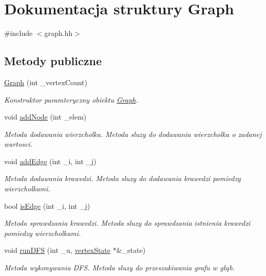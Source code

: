 \hypertarget{struct_graph}{\section{Dokumentacja struktury Graph}
\label{struct_graph}
}


{\ttfamily \#include $<$graph.\-hh$>$}

\subsection*{Metody publiczne}
\begin{DoxyCompactItemize}
\item 
\hyperlink{struct_graph_af3ba578bbc7a49562ff5de0f5f37c663}{Graph} (int \-\_\-vertex\-Count)
\begin{DoxyCompactList}\small\item\em Konstruktor paramteryczny obiektu \hyperlink{struct_graph}{Graph}. \end{DoxyCompactList}\item 
void \hyperlink{struct_graph_a8ad83b85369c9d92229137873f9089b8}{add\-Node} (int \-\_\-elem)
\begin{DoxyCompactList}\small\item\em Metoda dodawania wierzcholka. Metoda sluzy do dodawania wierzcholka o zadanej wartosci. \end{DoxyCompactList}\item 
void \hyperlink{struct_graph_a97e1714cf7b5f082158d112a0fbd4141}{add\-Edge} (int \-\_\-i, int \-\_\-j)
\begin{DoxyCompactList}\small\item\em Metoda dodawania krawedzi. Metoda sluzy do dodawania krawedzi pomiedzy wierzcholkami. \end{DoxyCompactList}\item 
bool \hyperlink{struct_graph_af8505da7d2360f8bf6daba137ed6ab9e}{is\-Edge} (int \-\_\-i, int \-\_\-j)
\begin{DoxyCompactList}\small\item\em Metoda sprawdzania krawedzi. Metoda sluzy do sprawdzania istnienia krawedzi pomiedzy wierzcholkami. \end{DoxyCompactList}\item 
void \hyperlink{struct_graph_a134ba75705fd92115b1c612b2681f6ea}{run\-D\-F\-S} (int \-\_\-u, \hyperlink{struct_graph_a0046a1a92a5949395eab395fed7b778c}{vertex\-State} $\ast$\&\-\_\-state)
\begin{DoxyCompactList}\small\item\em Metoda wykonywania D\-F\-S. Metoda sluzy do przeszukiwania grafu w głąb. \end{DoxyCompactList}\item 

\end{DoxyCompactItemize}
